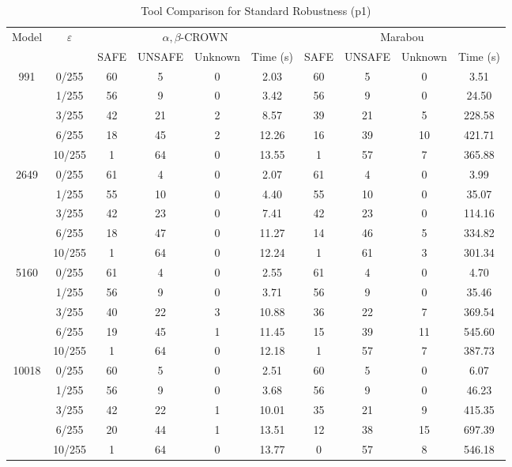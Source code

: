 \begin{table}[htbp]
\centering
\caption{Tool Comparison for Standard Robustness (p1)}
\label{tab:p1_tool_comparison}
\begin{tabular}{|c|c|c|c|c|c|c|c|c|c|}
\hline
\multirow{2}{*}{Model} & \multirow{2}{*}{$\varepsilon$} & \multicolumn{4}{c|}{$\alpha,\beta$-CROWN} & \multicolumn{4}{c|}{Marabou} \\ \cline{3-10}
 & & SAFE & UNSAFE & Unknown & Time (s) & SAFE & UNSAFE & Unknown & Time (s) \\ \hline
\multirow{5}{*}{991} & 0/255 & 60 & 5 & 0 & 2.03 & 60 & 5 & 0 & 3.51 \\ 
  & 1/255 & 56 & 9 & 0 & 3.42 & 56 & 9 & 0 & 24.50 \\ 
  & 3/255 & 42 & 21 & 2 & 8.57 & 39 & 21 & 5 & 228.58 \\ 
  & 6/255 & 18 & 45 & 2 & 12.26 & 16 & 39 & 10 & 421.71 \\ 
  & 10/255 & 1 & 64 & 0 & 13.55 & 1 & 57 & 7 & 365.88 \\ \hline
\hline
\multirow{5}{*}{2649} & 0/255 & 61 & 4 & 0 & 2.07 & 61 & 4 & 0 & 3.99 \\ 
  & 1/255 & 55 & 10 & 0 & 4.40 & 55 & 10 & 0 & 35.07 \\ 
  & 3/255 & 42 & 23 & 0 & 7.41 & 42 & 23 & 0 & 114.16 \\ 
  & 6/255 & 18 & 47 & 0 & 11.27 & 14 & 46 & 5 & 334.82 \\ 
  & 10/255 & 1 & 64 & 0 & 12.24 & 1 & 61 & 3 & 301.34 \\ \hline
\hline
\multirow{5}{*}{5160} & 0/255 & 61 & 4 & 0 & 2.55 & 61 & 4 & 0 & 4.70 \\ 
  & 1/255 & 56 & 9 & 0 & 3.71 & 56 & 9 & 0 & 35.46 \\ 
  & 3/255 & 40 & 22 & 3 & 10.88 & 36 & 22 & 7 & 369.54 \\ 
  & 6/255 & 19 & 45 & 1 & 11.45 & 15 & 39 & 11 & 545.60 \\ 
  & 10/255 & 1 & 64 & 0 & 12.18 & 1 & 57 & 7 & 387.73 \\ \hline
\hline
\multirow{5}{*}{10018} & 0/255 & 60 & 5 & 0 & 2.51 & 60 & 5 & 0 & 6.07 \\ 
  & 1/255 & 56 & 9 & 0 & 3.68 & 56 & 9 & 0 & 46.23 \\ 
  & 3/255 & 42 & 22 & 1 & 10.01 & 35 & 21 & 9 & 415.35 \\ 
  & 6/255 & 20 & 44 & 1 & 13.51 & 12 & 38 & 15 & 697.39 \\ 
  & 10/255 & 1 & 64 & 0 & 13.77 & 0 & 57 & 8 & 546.18 \\ 
\hline
\end{tabular}
\end{table}
